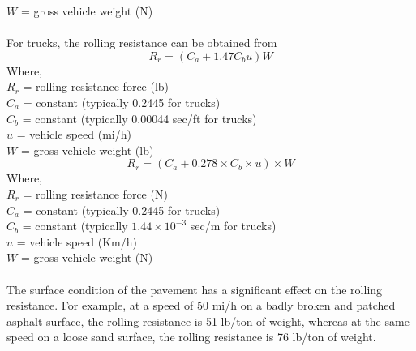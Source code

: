 \hspace*{10mm}$W$ = gross vehicle weight (N)\\\\
For trucks, the rolling resistance can be obtained from
\begin{equation}
	R_r = (C_a+1.47C_b u)W
\end{equation}
Where,\\
\hspace*{10mm}$R_r$ = rolling resistance force (lb)\\
\hspace*{10mm}$C_a$ = constant (typically 0.2445 for trucks)\\
\hspace*{10mm}$C_b$ = constant (typically 0.00044 sec/ft for trucks)\\
\hspace*{10mm}$u$ = vehicle speed (mi/h)\\
\hspace*{10mm}$W$ = gross vehicle weight (lb)
\begin{equation}
	R_r = (C_a + 0.278 \times C_b \times u)\times W
\end{equation}
Where,\\
\hspace*{10mm}$R_r$ = rolling resistance force (N)\\
\hspace*{10mm}$C_a$ = constant (typically 0.2445 for trucks)\\
\hspace*{10mm}$C_b$ = constant (typically $1.44 \times 10^{-3}$ sec/m  for trucks)\\
\hspace*{10mm}$u$ = vehicle speed (Km/h)\\
\hspace*{10mm}$W$ = gross vehicle weight (N)\\\\
The surface condition of the pavement has a significant effect on the rolling resistance. For example, at a speed of 50 mi/h on a badly broken and patched asphalt surface, the rolling resistance is 51 lb/ton of weight, whereas at the same speed on a loose sand surface, the rolling resistance is 76 lb/ton of weight.
